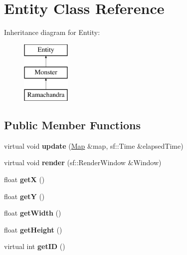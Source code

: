 \hypertarget{class_entity}{\section{Entity Class Reference}
\label{class_entity}
}
Inheritance diagram for Entity\-:\begin{figure}[H]
\begin{center}
\leavevmode
\includegraphics[height=3.000000cm]{class_entity}
\end{center}
\end{figure}
\subsection*{Public Member Functions}
\begin{DoxyCompactItemize}
\item 
\hypertarget{class_entity_a7b3312cce57dd71b479a0d85232c3bcf}{virtual void {\bfseries update} (\hyperlink{class_map}{Map} \&map, sf\-::\-Time \&elapsed\-Time)}\label{class_entity_a7b3312cce57dd71b479a0d85232c3bcf}

\item 
\hypertarget{class_entity_a7ed67f40d2626b3b79667b3c56a27c90}{virtual void {\bfseries render} (sf\-::\-Render\-Window \&Window)}\label{class_entity_a7ed67f40d2626b3b79667b3c56a27c90}

\item 
\hypertarget{class_entity_abc5b6d26c039bf3bf6faa766990768b4}{float {\bfseries get\-X} ()}\label{class_entity_abc5b6d26c039bf3bf6faa766990768b4}

\item 
\hypertarget{class_entity_ab6dd7b404c13754202acfe3d2c65c77b}{float {\bfseries get\-Y} ()}\label{class_entity_ab6dd7b404c13754202acfe3d2c65c77b}

\item 
\hypertarget{class_entity_abe6071cb041670ae7211b5e91c00a84a}{float {\bfseries get\-Width} ()}\label{class_entity_abe6071cb041670ae7211b5e91c00a84a}

\item 
\hypertarget{class_entity_af461ab9c4738878b3160806d92f91e3a}{float {\bfseries get\-Height} ()}\label{class_entity_af461ab9c4738878b3160806d92f91e3a}

\item 
\hypertarget{class_entity_a3c60d3c0561843490e93bde1f4566900}{virtual int {\bfseries get\-I\-D} ()}\label{class_entity_a3c60d3c0561843490e93bde1f4566900}

\end{DoxyCompactItemize}

